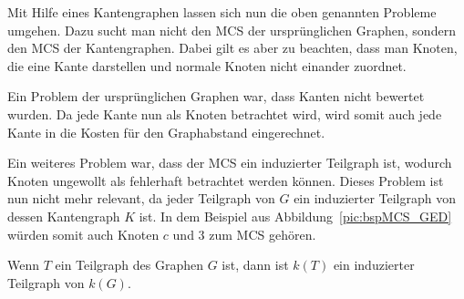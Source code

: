 Mit Hilfe eines Kantengraphen lassen sich nun die oben genannten 
Probleme umgehen. Dazu sucht man nicht den MCS der ursprünglichen 
Graphen, sondern den MCS der Kantengraphen. Dabei gilt es aber zu 
beachten, dass man Knoten, die eine Kante darstellen und normale 
Knoten nicht einander zuordnet.

Ein Problem der ursprünglichen Graphen war, dass Kanten nicht 
bewertet wurden. Da jede Kante nun als Knoten betrachtet wird, 
wird somit auch jede Kante in die Kosten für den Graphabstand 
eingerechnet. 

Ein weiteres Problem war, dass der MCS ein induzierter Teilgraph ist, 
wodurch Knoten ungewollt als fehlerhaft betrachtet werden können. Dieses 
Problem ist nun nicht mehr relevant, da jeder Teilgraph von $G$ ein 
induzierter Teilgraph von dessen Kantengraph $K$ ist. In dem 
Beispiel aus Abbildung~\ref{pic:bspMCS_GED} würden somit auch 
Knoten $c$ und $3$ zum MCS gehören.

\begin{myTheo}
Wenn $T$ ein Teilgraph des Graphen $G$ ist, dann ist $k(T)$ ein 
induzierter Teilgraph von $k(G)$.
\end{myTheo}

